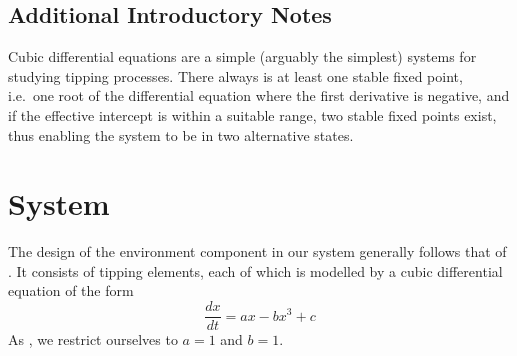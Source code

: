 \documentclass[letterpaper]{article}
\begin{document}



\subsection{Additional Introductory Notes}

Cubic differential equations are a simple (arguably the simplest)
systems for studying tipping processes. There always is at least one
stable fixed point, i.e.\ one root of the differential equation where
the first derivative is negative, and if the effective intercept is
within a suitable range, two stable fixed points exist, thus enabling
the system to be in two alternative states.


\section{System}

The design of the environment component in our system generally
follows that of \citet{Klose2019_interactingtippingelements}. It consists of
tipping elements, each of which is modelled by a cubic differential equation of the
form
\begin{equation}
  \label{eq_cubic}
  \frac{dx}{dt} = ax - bx^3 + c
\end{equation}
As \citet{Klose2019_interactingtippingelements}, we restrict
ourselves to $a = 1$ and $b = 1$.
\end{document}
